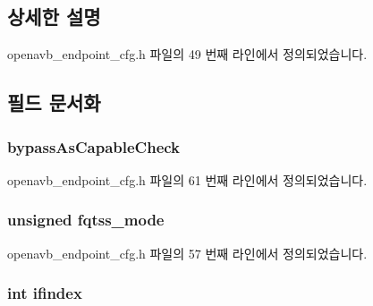 \subsection{상세한 설명}


openavb\+\_\+endpoint\+\_\+cfg.\+h 파일의 49 번째 라인에서 정의되었습니다.



\subsection{필드 문서화}
\subsubsection[{\texorpdfstring{bypass\+As\+Capable\+Check}{bypassAsCapableCheck}}]{ bypass\+As\+Capable\+Check}\hypertarget{structopenavb__endpoint__cfg__t_a95985194beeb1c1f3afe51922422b261}{}\label{structopenavb__endpoint__cfg__t_a95985194beeb1c1f3afe51922422b261}


openavb\+\_\+endpoint\+\_\+cfg.\+h 파일의 61 번째 라인에서 정의되었습니다.

\subsubsection[{\texorpdfstring{fqtss\+\_\+mode}{fqtss_mode}}]{\setlength{\rightskip}{0pt plus 5cm}unsigned fqtss\+\_\+mode}\hypertarget{structopenavb__endpoint__cfg__t_a3a09404ec6009d8bebf0a96f01d77dde}{}\label{structopenavb__endpoint__cfg__t_a3a09404ec6009d8bebf0a96f01d77dde}


openavb\+\_\+endpoint\+\_\+cfg.\+h 파일의 57 번째 라인에서 정의되었습니다.

\subsubsection[{\texorpdfstring{ifindex}{ifindex}}]{\setlength{\rightskip}{0pt plus 5cm}int ifindex}\hypertarget{structopenavb__endpoint__cfg__t_a01e636f8746c84f1cf3d45c4afbfde35}{}\label{structopenavb__endpoint__cfg__t_a01e636f8746c84f1cf3d45c4afbfde35}


